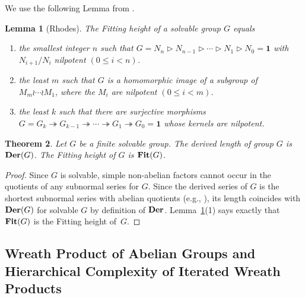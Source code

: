 \documentclass[a4paper,11pt]{amsart}
\newtheorem{theorem}{Theorem}[section]
\newtheorem{lemma}[theorem]{Lemma}
\theoremstyle{definition}
\newcommand{\Fit}{{\bf Fit}}
\newcommand{\Der}{{\bf Der}}
\newcommand{\sur}{\twoheadrightarrow}
\newcommand{\1}{{\mathbf 1}}
\begin{document}
We use the following Lemma from \cite[p.~17]{wildbook}. 
\begin{lemma}[Rhodes] \label{RhodesLemma}
The Fitting height of a solvable group $G$ equals
\begin{enumerate}
\item the smallest integer $n$ such that 
$G=N_n \rhd N_{n-1} \rhd \cdots \rhd N_1 \rhd N_0=\1$ with $N_{i+1}/N_i$ nilpotent $(0\leq i <n)$.
\item the least $m$ such that $G$ is a homomorphic image of a subgroup of\\ $M_m \wr \cdots \wr M_1$, where the $M_i$ are nilpotent $(0\leq i <m)$.
\item the least $k$ such that there are surjective morphisms\\
$G=G_k \sur G_{k-1} \sur \cdots \sur G_1 \sur G_0= \1$ whose kernels are nilpotent.
\end{enumerate}
\end{lemma}


\begin{theorem}
Let $G$ be a finite solvable group. 
The derived length of group $G$ is $\Der(G)$.
The Fitting height of $G$ is $\Fit(G)$.
\end{theorem}
\begin{proof}  
Since $G$ is solvable,  simple non-abelian factors cannot occur in the quotients of any subnormal series for $G$. Since the derived series of $G$ is the shortest subnormal series with abelian quotients (e.g., \cite[proof of Theorem~9.2.5]{Hall}), its length coincides with $\Der(G)$ for solvable $G$ by definition of $\Der$.
Lemma~\ref{RhodesLemma}(1) says exactly that $\Fit(G)$ is the Fitting height of~$G$. 
\end{proof}


\subsection{Wreath Product of Abelian Groups and Hierarchical Complexity of Iterated Wreath Products}
\end{document}
